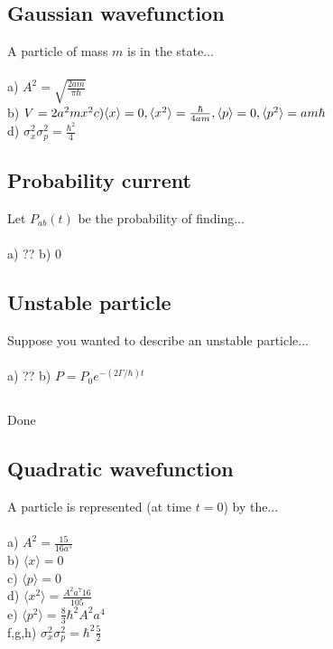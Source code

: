 \documentclass{article}
\newcommand{\<}{\langle}
\renewcommand{\>}{\rangle}
\begin{document}
\subsection{}
\subsection{}
\subsection{Gaussian wavefunction}
A particle of mass $m$ is in the state...
\\ \\
a) $A^2 = \sqrt{\frac{2am}{\pi \hbar}}$ \\
b) $V = 2a^2mx^2 \\
c) \<x\> = 0, \<x^2\> = \frac{\hbar}{4am}, \<p\> = 0, \<p^2\> = am\hbar$ \\
d) $\sigma_x^2 \sigma_p^2 = \frac{\hbar^2}{4}$
\subsection{}
\subsection{}
\subsection{}
\subsection{}
\subsection{Probability current}
Let $P_{ab}(t)$ be the probability of finding...
\\ \\
a) ?? b) 0
\subsection{Unstable particle}
Suppose you wanted to describe an unstable particle...
\\ \\
a) ?? b) $P = P_0 e^{-(2\Gamma / \hbar) t}$
\subsection{}
Done
\subsection{Quadratic wavefunction}
A particle is represented (at time $t = 0$) by the...
\\ \\
a) $A^2 = \frac{15}{16 a^5}$ \\
b) $\<x\> = 0$ \\
c) $\<p\> = 0$ \\
d) $\<x^2\> = \frac{A^2 a^7 16}{105}$ \\
e) $\<p^2\> = \frac{8}{3} \hbar^2 A^2 a^4$ \\
f,g,h) $\sigma_x^2 \sigma_p^2 = \hbar^2 \frac{5}{2}$
\end{document}
